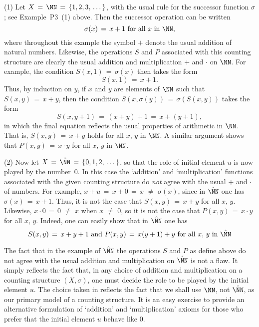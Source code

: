 {        (1) Let $X \,=\, {\NN} \,=\, \{1,2,3,\,{\ldots}\,\}$, with the usual rule for the successor function ${\sigma}$; see Example~P3~(1) above.
    Then the successor operation can be written
        \begin{displaymath}
        {\sigma}(x) \,=\, x+1 \mbox{ for all $x$ in ${\NN}$},
        \end{displaymath}
    where throughout this example the symbol $+$ denote the usual addition of natural numbers.
    Likewise, the operations $S$ and $P$ associated with this counting structure are clearly the usual addition and multiplication $+$ and ${\cdot}$ on ${\NN}$.
    For example, the condition $S(x,1) \,=\, {\sigma}(x)$ then takes the form
        \begin{displaymath}
        S(x,1) \,=\, x+1.
        \end{displaymath}
    Thus, by induction on $y$, if $x$ and $y$ are elements of ${\NN}$ such that $S(x,y) \,=\, x+y$,
then the condition $S(x,{\sigma}(y)) \,=\, {\sigma}\left(S(x,y)\right)$ takes the form
        \begin{displaymath}
        S(x,y+1) \,=\, (x+y)+1 \,=\, x+(y+1),
        \end{displaymath}
    in which the final equation reflects the usual properties of arithmetic in ${\NN}$.
    That is, $S(x,y) \,=\, x+y$ holds for all $x$, $y$  in ${\NN}$.
    A similar argument shows that $P(x,y) \,=\, x{\cdot}y$ for all $x$, $y$ in ${\NN}$.

\V

        (2) Now let $X \,=\, \hat{{\NN}} \,=\, \{0,1,2,\,{\ldots}\,\}$, so that the role of initial element $u$ is now played by the number~$0$.
    In this case the `addition' and `multiplication' functions associated with the given counting structure do {\em not} agree with the usual $+$ and ${\cdot}$ of numbers.
    For example, $x+u \,=\, x+0 \,=\, x \,\,{\neq}\,\, {\sigma}(x)$, since in $\hat{{\NN}}$ one has ${\sigma}(x) \,=\, x+1$.
    Thus, it is not the case that $S(x,y) \,=\, x+y$ for all $x$, $y$.
    Likewise, $x{\cdot}0 \,=\, 0 \,\,{\neq}\,\,x$ when $x \,\,{\neq}\,\, 0$,  so it is not the case that $P(x,y) \,=\, x{\cdot}y$ for all $x$, $y$.
    Indeed, one can easily show that in $\hat{{\NN}}$ one has
        \begin{displaymath}
        S(x,y) \,=\, x+y+1 \mbox{ and } P(x,y) \,=\, x(y+1) + y \mbox{ for all $x$, $y$ in $\hat{{\NN}}$}
        \end{displaymath}

        The fact that in the example of $\hat{{\NN}}$ the operations $S$ and $P$ as define above do not agree with the usual addition and multiplication on $\hat{{\NN}}$ is not a flaw.
    It simply reflects the fact that, in any choice of addition and multiplication on a counting structure $(X,{\sigma})$,
    one must decide the role to be played by the initial element $u$.
    The choice taken in {\TheseNotes} reflects the fact that we shall use ${\NN}$, not $\hat{{\NN}}$,
    as our primary model of a counting structure.
    It is an easy exercise to provide an alternative formulation of `addition'  and `multiplication' axioms for those who prefer that the initial element $u$ behave like $0$.

}
